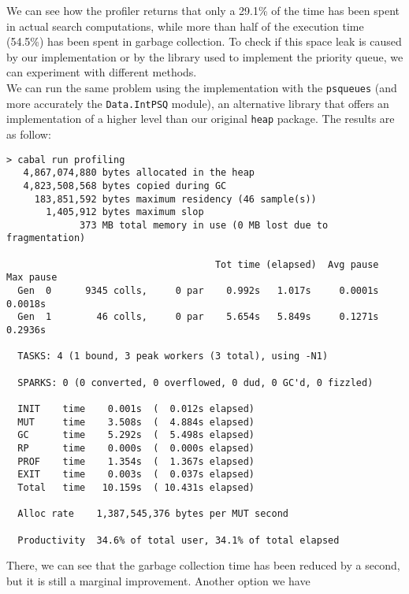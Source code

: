 We can see how the profiler returns that only a 29.1\% of the time has been
spent in actual search computations, while more than half of the execution time
(54.5\%) has been spent in garbage collection. To check if this space leak is
caused by our implementation or by the library used to implement the priority
queue, we can experiment with different methods.\\

We can run the same problem using the implementation with the \texttt{psqueues}
(and more accurately the \texttt{Data.IntPSQ} module), an alternative library
that offers an implementation of a higher level than our original \texttt{heap}
package. The results are as follow:


\begin{lstlisting}
> cabal run profiling
   4,867,074,880 bytes allocated in the heap
   4,823,508,568 bytes copied during GC
     183,851,592 bytes maximum residency (46 sample(s))
       1,405,912 bytes maximum slop
             373 MB total memory in use (0 MB lost due to fragmentation)

                                     Tot time (elapsed)  Avg pause  Max pause
  Gen  0      9345 colls,     0 par    0.992s   1.017s     0.0001s    0.0018s
  Gen  1        46 colls,     0 par    5.654s   5.849s     0.1271s    0.2936s

  TASKS: 4 (1 bound, 3 peak workers (3 total), using -N1)

  SPARKS: 0 (0 converted, 0 overflowed, 0 dud, 0 GC'd, 0 fizzled)

  INIT    time    0.001s  (  0.012s elapsed)
  MUT     time    3.508s  (  4.884s elapsed)
  GC      time    5.292s  (  5.498s elapsed)
  RP      time    0.000s  (  0.000s elapsed)
  PROF    time    1.354s  (  1.367s elapsed)
  EXIT    time    0.003s  (  0.037s elapsed)
  Total   time   10.159s  ( 10.431s elapsed)

  Alloc rate    1,387,545,376 bytes per MUT second

  Productivity  34.6% of total user, 34.1% of total elapsed
\end{lstlisting}


There, we can see that the garbage collection time has been reduced by a
second, but it is still a marginal improvement. Another option we have 


\newpage
